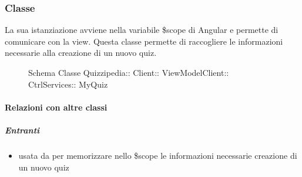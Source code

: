 \subsubsection{Classe }
La sua istanziazione avviene nella variabile \$scope di Angular e permette di comunicare con la view. Questa classe permette di raccogliere le informazioni necessarie alla creazione di un nuovo quiz.
\begin{figure}[H]
\centering
\noindent{}
\caption[Schema Classe MyQuiz]{Schema Classe Quizzipedia:: Client:: ViewModelClient:: CtrlServices:: MyQuiz}
\end{figure}
\paragraph{Relazioni con altre classi}
\subparagraph{Entranti}
\begin{itemize}
\item usata da  per memorizzare nello \$scope le informazioni necessarie creazione di un nuovo quiz
\end{itemize}
